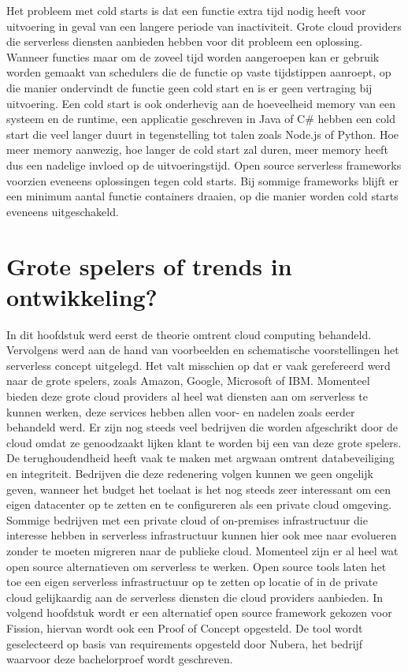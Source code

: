 \begin{description}[style=unboxed, labelwidth=\linewidth, listparindent =0pt]
     \item[Cold start]
     Het probleem met cold starts is dat een functie extra tijd nodig heeft voor uitvoering in geval van een langere periode van inactiviteit. Grote cloud providers die serverless diensten aanbieden hebben voor dit probleem een oplossing. Wanneer functies maar om de zoveel tijd worden aangeroepen kan er gebruik worden gemaakt van schedulers die de functie op vaste tijdstippen aanroept, op die manier ondervindt de functie geen cold start en is er geen vertraging bij uitvoering. Een cold start is ook onderhevig aan de hoeveelheid memory van een systeem en de runtime, een applicatie geschreven in Java of C\# hebben een cold start die veel langer duurt in tegenstelling tot talen zoals Node.js  of Python.  Hoe meer memory aanwezig, hoe langer de cold start zal duren, meer memory heeft dus een nadelige invloed op de uitvoeringstijd. Open source serverless frameworks voorzien eveneens oplossingen tegen cold starts. Bij sommige frameworks blijft er een minimum aantal functie containers draaien, op die manier worden cold starts eveneens uitgeschakeld.
\end{description}

\section{Grote spelers of trends in ontwikkeling?}
In dit hoofdstuk werd eerst de theorie omtrent cloud computing behandeld. Vervolgens werd aan de hand van voorbeelden en schematische voorstellingen het serverless concept uitgelegd. Het valt misschien op dat er vaak gerefereerd werd naar de grote spelers, zoals Amazon, Google, Microsoft of IBM. Momenteel bieden deze grote cloud providers al heel wat diensten aan om serverless te kunnen werken, deze services hebben allen voor- en nadelen zoals eerder behandeld werd. Er zijn nog steeds veel bedrijven die worden afgeschrikt door de cloud omdat ze genoodzaakt lijken klant te worden bij een van deze grote spelers. De terughoudendheid heeft vaak te maken met argwaan omtrent databeveiliging en integriteit. Bedrijven die deze redenering volgen kunnen we geen ongelijk geven, wanneer het budget het toelaat is het nog steeds zeer interessant om een eigen datacenter op te zetten en te configureren als een private cloud omgeving. Sommige bedrijven met een private cloud of on-premises infrastructuur die interesse hebben in serverless infrastructuur kunnen hier ook mee naar evolueren zonder te moeten migreren naar de publieke cloud. Momenteel zijn er al heel wat open source alternatieven om serverless te werken. Open source tools laten het toe een eigen serverless infrastructuur op te zetten op locatie of in de private cloud gelijkaardig aan de serverless diensten die cloud providers aanbieden. In volgend hoofdstuk wordt er een alternatief open source framework gekozen voor Fission, hiervan wordt ook een Proof of Concept opgesteld. De tool wordt geselecteerd op basis van requirements opgesteld door Nubera, het bedrijf waarvoor deze bachelorproef wordt geschreven.

